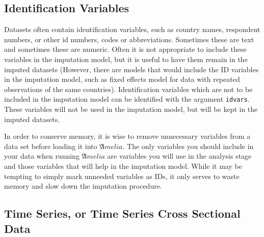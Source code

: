 \documentclass[12pt,titlepage]{article}
\begin{document}
\subsection{Identification Variables}
\label{sec:idvars}
Datasets often contain identification variables, such as country
names, respondent numbers, or other id numbers, codes or
abbreviations.  Sometimes these are text and sometimes these are
numeric.  Often it is not appropriate to include these variables in
the imputation model, but it is useful to have them remain in the
imputed datasets (However, there are models that would include the ID
variables in the imputation model, such as fixed effects model for
data with repeated observations of the same countries).
Identification variables which are not to be included in the
imputation model can be identified with the argument \texttt{idvars}.
These variables will not be used in the imputation model, but will be
kept in the imputed datasets.

In order to conserve memory, it is wise to remove unnecessary
variables from a data set before loading it into ${\mathfrak Amelia}$.
The only variables you should include in your data when running
${\mathfrak Amelia}$ are variables you will use in the analysis stage
and those variables that will help in the imputation model.  While it
may be tempting to simply mark unneeded variables as IDs, it only
serves to waste memory and slow down the imputation procedure.

\subsection{Time Series, or Time Series Cross Sectional Data} \label{sec:tscs}
\end{document}
